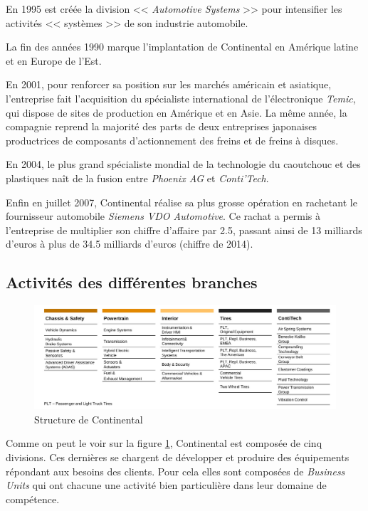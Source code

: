 En 1995 est créée la division << \textit{Automotive Systems} >> pour intensifier les activités << systèmes >> de son industrie automobile.

La fin des années 1990 marque l'implantation de Continental en Amérique latine et en Europe de l'Est.

En 2001, pour renforcer sa position sur les marchés américain et asiatique, l'entreprise fait l'acquisition du spécialiste international de l'électronique \textit{Temic}, qui dispose de sites de production en Amérique et en Asie. La même année, la compagnie reprend la majorité des parts de deux entreprises japonaises productrices de composants d'actionnement des freins et de freins à disques. 

En 2004, le plus grand spécialiste mondial de la technologie du caoutchouc et des plastiques naît de la fusion entre \textit{Phoenix AG} et \textit{Conti'Tech}.

Enfin en juillet 2007, Continental réalise sa plus grosse opération en rachetant le fournisseur automobile \textit{Siemens VDO Automotive}. Ce rachat a permis à l'entreprise de multiplier son chiffre d'affaire par 2.5, passant ainsi de 13 milliards d'euros à plus de 34.5 milliards d'euros (chiffre de 2014).
		
		\subsection{Activités des différentes branches}
		\begin{figure}[H]
			\hspace{-55px}
			\includegraphics[width=21cm]{contents/images/structureConti.jpg}
			\caption{Structure de Continental}
			\label{fig:structConti}
		\end{figure}

		Comme on peut le voir sur la figure \ref{fig:structConti}, Continental est composée de cinq divisions. Ces dernières se chargent de développer et produire des équipements répondant aux besoins des clients. Pour cela elles sont composées de \textit{Business Units} qui ont chacune une activité bien particulière dans leur domaine de compétence. 


